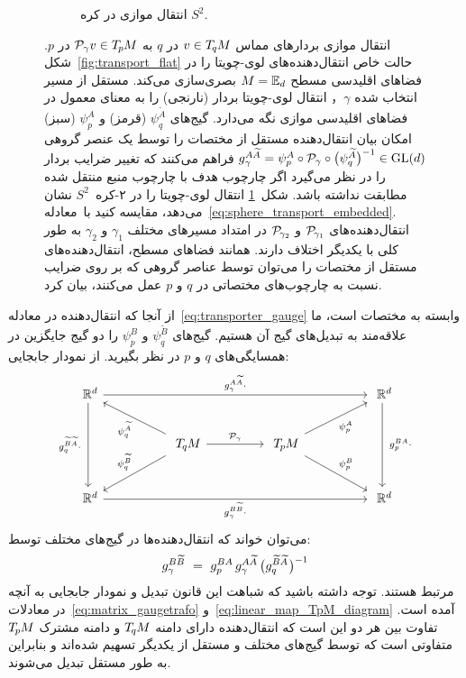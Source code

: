 \begin{figure}
\begin{subfigure}[b]{0.4\textwidth}
		\vspace*{-2ex}
		\caption{\small
			انتقال موازی در کره $S^2$.
		}
		\label{fig:transport_sphere}
	\end{subfigure}
	\caption{\small
		انتقال موازی بردارهای مماس $v\in T_{\mkern-1.5mu q}\mkern-.5muM$ در $q$ به $\mathcal{P}_\gamma v \in T_{\mkern-1.5mu p}\mkern-.5muM$ در $p$.
		شکل~\ref{fig:transport_flat} حالت خاص انتقال‌دهنده‌های لوی-چویتا را در فضاهای اقلیدسی مسطح $M = \mathbb{E}_d$ بصری‌سازی می‌کند.
		مستقل از مسیر انتخاب شده $\gamma$， انتقال لوی-چویتا بردار (نارنجی) را به معنای معمول در فضاهای اقلیدسی موازی نگه می‌دارد.
		گیج‌های $\psi_q^{\widetilde{A}}$ (قرمز) و $\psi_p^A$ (سبز) امکان بیان انتقال‌دهنده مستقل از مختصات را توسط یک عنصر گروهی
		$g_\gamma^{A\widetilde{A}} = \psi_p^A \circ \mathcal{P}_\gamma \circ \big(\psi_q^{\widetilde{A}}\big)^{-1} \in \operatorname{GL}(d)$
		فراهم می‌کنند که تغییر ضرایب بردار را در نظر می‌گیرد اگر چارچوب هدف با چارچوب منبع منتقل شده مطابقت نداشته باشد.
		شکل~\ref{fig:transport_sphere} انتقال لوی-چویتا را در ۲-کره~$S^2$ نشان می‌دهد، مقایسه کنید با~معادله~\eqref{eq:sphere_transport_embedded}.
		انتقال‌دهنده‌های $\mathcal{P}_{\mkern-2mu\gamma_1}$ و $\mathcal{P}_{\mkern-2mu\gamma_2}$ در امتداد مسیرهای مختلف $\gamma_1$ و $\gamma_2$ به طور کلی با یکدیگر اختلاف دارند.
		همانند فضاهای مسطح، انتقال‌دهنده‌های مستقل از مختصات را می‌توان توسط عناصر گروهی که بر روی ضرایب نسبت به چارچوب‌های مختصاتی در $q$ و $p$ عمل می‌کنند، بیان کرد.
	}
	\label{fig:transport}
\end{figure}


از آنجا که انتقال‌دهنده در معادله~\eqref{eq:transporter_gauge} وابسته به مختصات است، ما علاقه‌مند به تبدیل‌های گیج آن هستیم.
گیج‌های $\psi_q^{\widetilde{B}}$ و $\psi_p^B$ را دو گیج جایگزین در همسایگی‌های $q$ و $p$ در نظر بگیرید.
از نمودار جابجایی:
\begin{equation}\label{cd:transporter_trivialization}
	\begin{tikzcd}[column sep=50pt, row sep=25pt, font=\normalsize]
		\R^d
		\arrow[dd, "g_q^{\widetilde{B}\widetilde{A}}\cdot\ "']
		\arrow[rrr, "g_\gamma^{A\widetilde{A}}\cdot"]
		& &[-1ex] &
		\R^d
		\arrow[dd, "\ g_p^{BA}\cdot"]
		\\
		&
		\TqM
		\arrow[ul, "\psi_q^{\widetilde{A}}"]
		\arrow[dl, "\psi_q^{\widetilde{B}}"']
		\arrow[r, "\mathcal{P}_\gamma"]
		&
		\TpM
		\arrow[ur, "\psi_p^A"']
		\arrow[dr, "\psi_p^B"]
		\\
		\R^d
		\arrow[rrr, "g_\gamma^{B\widetilde{B}}\cdot"']
		& & &
		\R^d
	\end{tikzcd}
\end{equation}
می‌توان خواند که انتقال‌دهنده‌ها در گیج‌های مختلف توسط:
\begin{align}\label{eq:transporter_gauge_trafo}
	g_\gamma^{B\widetilde{B}}
	\ =\ g_p^{BA}\, g_\gamma^{A\widetilde{A}}\, \big(g_q^{\widetilde{B}\widetilde{A}} \mkern1mu\big)^{-1}
\end{align}
مرتبط هستند.
توجه داشته باشید که شباهت این قانون تبدیل و نمودار جابجایی به آنچه در معادلات~\eqref{eq:matrix_gaugetrafo} و~\eqref{eq:linear_map_TpM_diagram} آمده است.
تفاوت بین هر دو این است که انتقال‌دهنده دارای دامنه $T_{\mkern-1.5mu q}\mkern-.5muM$ و دامنه مشترک $T_{\mkern-1.5mu p}\mkern-.5muM$ متفاوتی است که توسط گیج‌های مختلف و مستقل از یکدیگر تسهیم شده‌اند و بنابراین به طور مستقل تبدیل می‌شوند.



